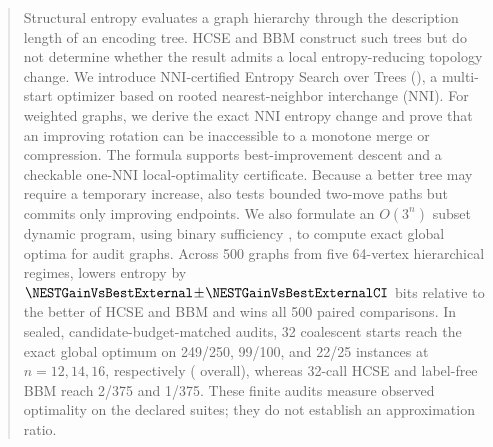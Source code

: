 \begin{abstract}
Structural entropy evaluates a graph hierarchy through the description length
of an encoding tree. HCSE and BBM \cite{pan2025} construct such trees but do not
determine whether the result admits a local entropy-reducing topology change.
We introduce NNI-certified Entropy Search over Trees (\NEST), a multi-start
optimizer based on rooted nearest-neighbor interchange (NNI). For weighted
graphs, we derive the exact NNI entropy change and prove that an improving
rotation can be inaccessible to a monotone merge or compression. The formula
supports best-improvement descent and a checkable one-NNI local-optimality
certificate. Because a better tree may require a temporary increase, \NEST also
tests bounded two-move paths but commits only improving endpoints. We also
formulate an $O(3^n)$ subset dynamic program, using binary sufficiency
\cite{zhang2021supertad,pan2025}, to compute exact global optima for audit
graphs. Across 500 graphs from five 64-vertex
hierarchical regimes, \NEST lowers entropy by
$\NESTGainVsBestExternal\!\pm\!\NESTGainVsBestExternalCI$ bits relative to the
better of HCSE and BBM and wins all 500 paired comparisons. In sealed,
candidate-budget-matched audits, 32 coalescent starts reach the exact global
optimum on 249/250, 99/100, and 22/25 instances at $n=12,14,16$, respectively
(\ScaleCombinedExact{} overall), whereas 32-call HCSE and label-free BBM reach
2/375 and 1/375. These finite audits measure observed optimality on the
declared suites; they do not establish an approximation ratio.
\end{abstract}
